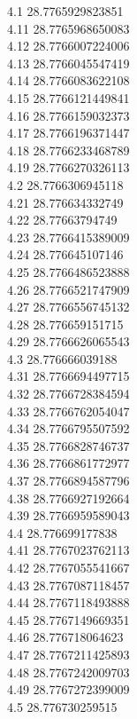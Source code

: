 {4.1	28.7765929823851\\
4.11	28.7765968650083\\
4.12	28.7766007224006\\
4.13	28.7766045547419\\
4.14	28.7766083622108\\
4.15	28.7766121449841\\
4.16	28.7766159032373\\
4.17	28.7766196371447\\
4.18	28.7766233468789\\
4.19	28.7766270326113\\
4.2	28.7766306945118\\
4.21	28.776634332749\\
4.22	28.77663794749\\
4.23	28.7766415389009\\
4.24	28.776645107146\\
4.25	28.7766486523888\\
4.26	28.7766521747909\\
4.27	28.7766556745132\\
4.28	28.776659151715\\
4.29	28.7766626065543\\
4.3	28.776666039188\\
4.31	28.7766694497715\\
4.32	28.7766728384594\\
4.33	28.7766762054047\\
4.34	28.7766795507592\\
4.35	28.7766828746737\\
4.36	28.7766861772977\\
4.37	28.7766894587796\\
4.38	28.7766927192664\\
4.39	28.7766959589043\\
4.4	28.776699177838\\
4.41	28.7767023762113\\
4.42	28.7767055541667\\
4.43	28.7767087118457\\
4.44	28.7767118493888\\
4.45	28.7767149669351\\
4.46	28.776718064623\\
4.47	28.7767211425893\\
4.48	28.7767242009703\\
4.49	28.7767272399009\\
4.5	28.776730259515\\
}
